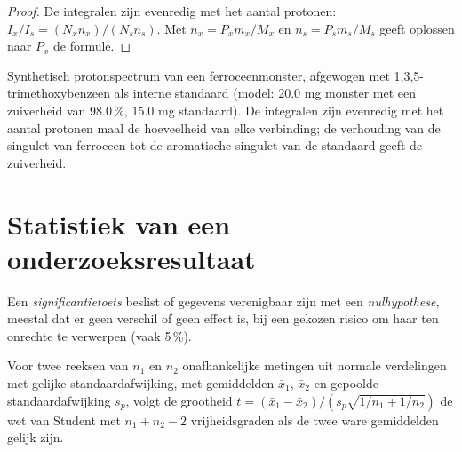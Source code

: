 \begin{proof}
De integralen zijn evenredig met het aantal protonen: $I_x/I_s = (N_xn_x)/(N_sn_s)$. Met
$n_x = P_xm_x/M_x$ en $n_s = P_sm_s/M_s$ geeft oplossen naar $P_x$ de formule.
\end{proof}

\begin{omfigure}

{\small Synthetisch protonspectrum van een ferroceenmonster, afgewogen met
1,3,5-trimethoxybenzeen als interne standaard (model: 20.0 mg monster met
een zuiverheid van 98.0\,\%, 15.0 mg standaard). De integralen zijn
evenredig met het aantal protonen maal de hoeveelheid van elke
verbinding; de verhouding van de singulet van ferroceen tot de
aromatische singulet van de standaard geeft de zuiverheid.}
\end{omfigure}

\section{Statistiek van een onderzoeksresultaat}

\begin{definition}[Significantietoetsen]\label{def:b3:lab-techniques-3:tests}
Een \emph{significantietoets} beslist of
gegevens verenigbaar zijn met een
\emph{nulhypothese}, meestal dat er geen verschil of
geen effect is, bij een gekozen risico om haar ten onrechte te verwerpen
(vaak 5\,\%).
\end{definition}

\begin{theorem}\label{thm:b3:lab-techniques-3:t-test}
Voor twee reeksen van $n_1$ en $n_2$ onafhankelijke metingen uit normale
verdelingen met gelijke standaardafwijking, met gemiddelden $\bar x_1$, $\bar x_2$ en gepoolde
standaardafwijking $s_p$, volgt de grootheid $t = (\bar x_1 - \bar x_2)/(s_p\sqrt{1/n_1 + 1/n_2})$ de wet van Student met
$n_1 + n_2 - 2$ vrijheidsgraden als de twee ware gemiddelden gelijk zijn. \admitted
\end{theorem}

